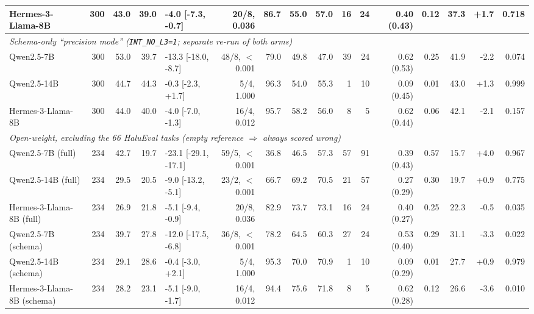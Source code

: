 \begin{table}[t]
{\begin{tabular}{lrrrlrrrrrrrrrrr}
Hermes-3-Llama-8B & 300 & 43.0 & 39.0 & -4.0 [-7.3, -0.7] & 20/8, 0.036 & 86.7 & 55.0 & 57.0 & 16 & 24 & 0.40 (0.43) & 0.12 & 37.3 & +1.7 & 0.718 \\
\midrule
\multicolumn{16}{l}{\emph{Schema-only ``precision mode'' (\texttt{INT\_NO\_L3=1}; separate re-run of both arms)}} \\
Qwen2.5-7B & 300 & 53.0 & 39.7 & -13.3 [-18.0, -8.7] & 48/8, $<$0.001 & 79.0 & 49.8 & 47.0 & 39 & 24 & 0.62 (0.53) & 0.25 & 41.9 & -2.2 & 0.074 \\
Qwen2.5-14B & 300 & 44.7 & 44.3 & -0.3 [-2.3, +1.7] & 5/4, 1.000 & 96.3 & 54.0 & 55.3 & 1 & 10 & 0.09 (0.45) & 0.01 & 43.0 & +1.3 & 0.999 \\
Hermes-3-Llama-8B & 300 & 44.0 & 40.0 & -4.0 [-7.0, -1.3] & 16/4, 0.012 & 95.7 & 58.2 & 56.0 & 8 & 5 & 0.62 (0.44) & 0.06 & 42.1 & -2.1 & 0.157 \\
\midrule
\multicolumn{16}{l}{\emph{Open-weight, excluding the 66 HaluEval tasks (empty reference $\Rightarrow$ always scored wrong)}} \\
Qwen2.5-7B (full) & 234 & 42.7 & 19.7 & -23.1 [-29.1, -17.1] & 59/5, $<$0.001 & 36.8 & 46.5 & 57.3 & 57 & 91 & 0.39 (0.43) & 0.57 & 15.7 & +4.0 & 0.967 \\
Qwen2.5-14B (full) & 234 & 29.5 & 20.5 & -9.0 [-13.2, -5.1] & 23/2, $<$0.001 & 66.7 & 69.2 & 70.5 & 21 & 57 & 0.27 (0.29) & 0.30 & 19.7 & +0.9 & 0.775 \\
Hermes-3-Llama-8B (full) & 234 & 26.9 & 21.8 & -5.1 [-9.4, -0.9] & 20/8, 0.036 & 82.9 & 73.7 & 73.1 & 16 & 24 & 0.40 (0.27) & 0.25 & 22.3 & -0.5 & 0.035 \\
Qwen2.5-7B (schema) & 234 & 39.7 & 27.8 & -12.0 [-17.5, -6.8] & 36/8, $<$0.001 & 78.2 & 64.5 & 60.3 & 27 & 24 & 0.53 (0.40) & 0.29 & 31.1 & -3.3 & 0.022 \\
Qwen2.5-14B (schema) & 234 & 29.1 & 28.6 & -0.4 [-3.0, +2.1] & 5/4, 1.000 & 95.3 & 70.0 & 70.9 & 1 & 10 & 0.09 (0.29) & 0.01 & 27.7 & +0.9 & 0.979 \\
Hermes-3-Llama-8B (schema) & 234 & 28.2 & 23.1 & -5.1 [-9.0, -1.7] & 16/4, 0.012 & 94.4 & 75.6 & 71.8 & 8 & 5 & 0.62 (0.28) & 0.12 & 26.6 & -3.6 & 0.010 \\
\bottomrule
\end{tabular}}
\end{table}
